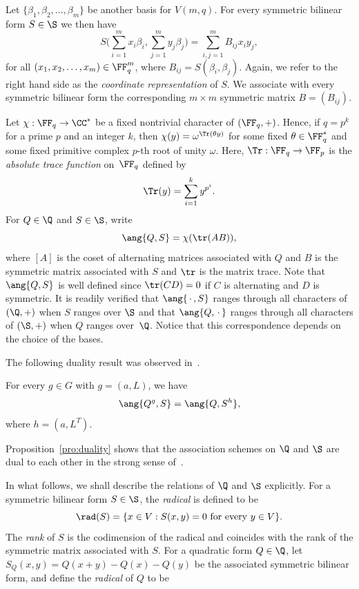 \par
Let $\{\beta_1,\beta_2,\dots,\beta_m\}$ be another basis for $V(m,q)$. For every symmetric bilinear form $S\in\S$ we then have
\[
S\bigg(\sum_{i=1}^mx_i\beta_i,\sum_{j=1}^my_j\beta_j\bigg)=\sum_{i,j=1}^mB_{ij}x_iy_j,
\]
for all $(x_1,x_2,\dots,x_m)\in\FF_q^m$, where $B_{ij}=S(\beta_i,\beta_j)$. Again, we refer to the right hand side as the \emph{coordinate representation} of $S$. We associate with every symmetric bilinear form the corresponding $m\times m$ symmetric matrix $B=(B_{ij})$.
\par
Let $\chi:\FF_q\to\CC^*$ be a fixed nontrivial character of $(\FF_q,+)$. Hence, if $q=p^k$ for a prime $p$ and an integer $k$, then $\chi(y)=\omega^{\Tr(\theta y)}$ for some fixed $\theta\in\FF_q^*$ and some fixed primitive complex $p$-th root of unity $\omega$. Here, $\Tr:\FF_q\to\FF_p$ is the \emph{absolute trace function} on~$\FF_q$ defined by
\[
\Tr(y)=\sum_{i=1}^ky^{p^i}.
\]
For $Q\in\Q$ and $S\in\S$, write
\begin{equation}
\ang{Q,S}=\chi(\tr(AB)),   \label{eqn:inner_product}
\end{equation}
where $[A]$ is the coset of alternating matrices associated with $Q$ and $B$ is the symmetric matrix associated with $S$ and $\tr$ is the matrix trace. Note that $\ang{Q,S}$ is well defined since $\tr(CD)=0$ if $C$ is alternating and $D$ is symmetric. It is readily verified that $\ang{\,\cdot\,,S}$ ranges through all characters of $(\Q,+)$ when $S$ ranges over $\S$ and that $\ang{Q,\,\cdot\,}$ ranges through all characters of $(\S,+)$ when $Q$ ranges over~$\Q$. Notice that this correspondence depends on the choice of the bases.
\par
The following duality result was observed in~\cite{WanWanMaMa2003}.
\enlargethispage{1.3ex}
\begin{prop}
\label{pro:duality}
For every $g\in G$ with $g=(a,L)$, we have
\[
\ang{Q^g,S}=\ang{Q,S^h},
\]
where $h=(a,L^T)$.
\end{prop}
\par
Proposition~\ref{pro:duality} shows that the association schemes on $\Q$ and $\S$ are dual to each other in the strong sense of~\cite[Definition~11]{DelLev1998}.
\par
In what follows, we shall describe the relations of $\Q$ and $\S$ explicitly. For a symmetric bilinear form $S\in\S$, the \emph{radical} is defined to be 
\[
\rad(S)=\{x\in V:\text{$S(x,y)=0$ for every $y\in V$}\}.
\]
The \emph{rank} of $S$ is the codimension of the radical and coincides with the rank of the symmetric matrix associated with $S$. For a quadratic form $Q\in\Q$, let $S_Q(x,y)=Q(x+y)-Q(x)-Q(y)$ be the associated symmetric bilinear form, and define the \emph{radical} of $Q$ to be 
